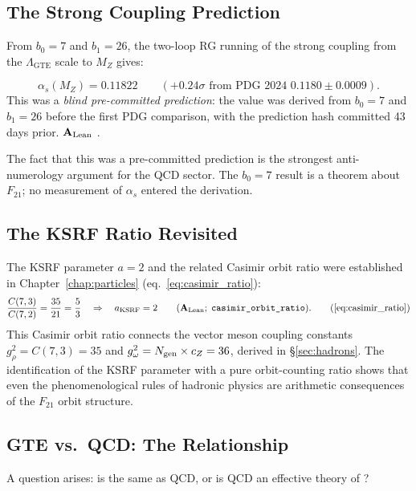\documentclass[11pt,openany]{book}
\theoremstyle{remark}
\newcommand{\GTE}{\text{GTE}}
\newcommand{\lean}[1]{%
  \penalty-100
  \begingroup\def\_{\textunderscore\allowbreak}\texttt{#1}\endgroup}
\newcommand{\Ngen}{N_{\rm gen}}
\newcommand{\CatAL}{\ensuremath{\textbf{A}_{\rm Lean}}}
\begin{document}
\subsection*{The Strong Coupling Prediction}

From $b_0 = 7$ and $b_1 = 26$, the two-loop RG running of the strong coupling from the
$\Lambda_{\GTE}$ scale to $M_Z$ gives:

\begin{tcolorbox}[colback=orange!5,colframe=orange!60,title={Result: Strong Coupling (\CatAL)}]
\[
  \alpha_s(M_Z) = 0.11822 \qquad (+0.24\sigma \text{ from PDG~2024 } 0.1180 \pm 0.0009).
\]
This was a \emph{blind pre-committed prediction}: the value was derived from $b_0 = 7$
and $b_1 = 26$ before the first PDG comparison, with the prediction hash committed
43 days prior.  \CatAL{} \cite{SpivackGTEQCDStructure}.
\end{tcolorbox}

The fact that this was a pre-committed prediction is the strongest anti-numerology
argument for the QCD sector.  The $b_0 = 7$ result is a theorem about $F_{21}$; no
measurement of $\alpha_s$ entered the derivation.

\subsection*{The KSRF Ratio Revisited}

The KSRF parameter $a = 2$ and the related Casimir orbit ratio were established in
Chapter~\ref{chap:particles} (eq.~\eqref{eq:casimir_ratio}):
\begin{equation}
  \frac{C(7,3)}{C(7,2)} = \frac{35}{21} = \frac{5}{3}
  \quad \Rightarrow \quad a_{\rm KSRF} = 2
  \qquad (\CatAL;\;\lean{casimir\_orbit\_ratio}).
  \tag{\ref{eq:casimir_ratio}}
\end{equation}
This Casimir orbit ratio connects the vector meson coupling constants
$g_\rho^2 = C(7,3) = 35$ and $g_\omega^2 = \Ngen \times c_Z = 36$, derived in
\S\ref{sec:hadrons}.  The identification of the KSRF parameter with a pure orbit-counting
ratio shows that even the phenomenological rules of hadronic physics are arithmetic
consequences of the $F_{21}$ orbit structure.

\subsection*{GTE vs.\ QCD: The Relationship}

A question arises: is \GTE{} the same as QCD, or is QCD an effective theory of \GTE{}?
\end{document}
